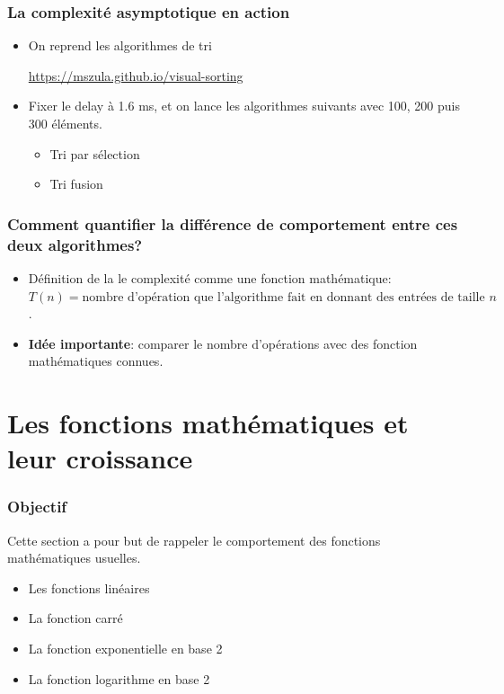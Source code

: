 \documentclass[aspectratio=169]{beamer}
\begin{document}
\begin{frame}
  \frametitle{La complexité asymptotique en action}

  \begin{itemize}
  \item On reprend les algorithmes de tri

    \alert{\url{https://mszula.github.io/visual-sorting}}
  \item Fixer le delay à 1.6 ms, et on lance les algorithmes suivants avec 100,
    200 puis 300 éléments.
    \begin{itemize}
    \item Tri par sélection
    \item Tri fusion
    \end{itemize}
  \end{itemize}

\end{frame}


\begin{frame}
  \frametitle{Comment quantifier la différence de comportement entre ces deux
    algorithmes?}

  \begin{itemize}
  \item Définition de la le complexité comme une fonction mathématique: \(T(n) =
    \text{nombre d'opération que l'algorithme fait en donnant des entrées de
      taille } n\).

  \item \textbf{\alert{Idée importante}}: comparer le nombre d'opérations avec
    des fonction mathématiques connues.


  \end{itemize}
\end{frame}


\section{Les fonctions mathématiques et leur croissance}
\begin{frame}
  \frametitle{Objectif}
  Cette section a pour but de rappeler le comportement des fonctions
  mathématiques usuelles.

  \begin{itemize}
  \item Les fonctions linéaires
  \item La fonction carré
  \item La fonction exponentielle en base 2
  \item La fonction logarithme en base 2
  \end{itemize}

\end{frame}
\end{document}
